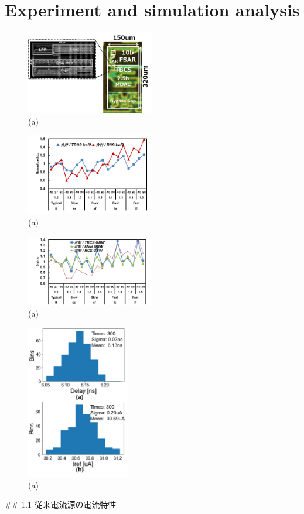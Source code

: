 \documentclass[letterpaper, 10 pt, conference]{ieeeconf}  %
\begin{document}
\section{Experiment and simulation analysis}
\begin{figure}[!]
\centering
 \includegraphics[width=0.5\textwidth]{figs/chip.png}
  \caption{(a) 
}
\label{fig2}
\end{figure}
\begin{figure}[!]
\centering
 \includegraphics[width=0.5\textwidth]{figs/pvt.png}
  \caption{(a) 
}
\label{fig2}
\end{figure}
\begin{figure}[!]
\centering
 \includegraphics[width=0.5\textwidth]{figs/pvt_gbw.png}
  \caption{(a) 
}
\label{fig2}
\end{figure}
\begin{figure}[!]
\centering
 \includegraphics[width=0.4\textwidth]{figs/mc.png}
  \caption{(a) 
}
\label{fig2}
\end{figure}
## 1.1 従来電流源の電流特性
\end{document}
